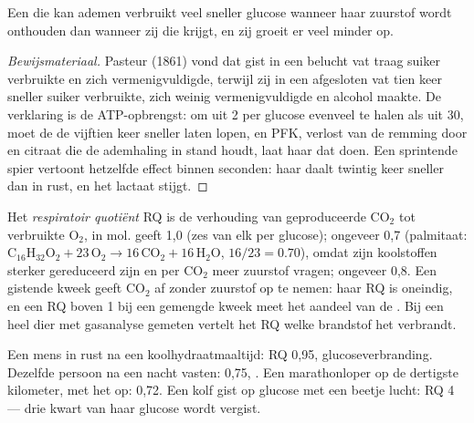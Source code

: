 \begin{proposition}\label{prop:b1:respiration-fermentation:pasteur}
Een  die kan ademen verbruikt veel sneller glucose wanneer haar zuurstof wordt
onthouden dan wanneer zij die krijgt, en zij groeit er veel minder op.
\end{proposition}
\begin{proof}[Bewijsmateriaal]
Pasteur (1861) vond dat gist in een belucht vat traag suiker verbruikte en zich
vermenigvuldigde, terwijl zij in een afgesloten vat tien keer sneller suiker
verbruikte, zich weinig vermenigvuldigde en alcohol maakte. De verklaring is de
ATP-opbrengst: om uit 2 per glucose evenveel  te halen als uit 30, moet de 
de  vijftien keer sneller laten lopen, en PFK, verlost van de remming
door  en citraat die de ademhaling in stand houdt, laat haar dat doen. Een
sprintende spier vertoont hetzelfde effect binnen seconden: haar  daalt
twintig keer sneller dan in rust, en het lactaat stijgt.
\end{proof}

\begin{definition}\label{def:b1:respiration-fermentation:rq}
Het \emph{respiratoir quotiënt} RQ is de verhouding van geproduceerde
$\mathrm{CO_2}$ tot verbruikte $\mathrm{O_2}$, in mol.  geeft 1,0 (zes
van elk per glucose);  ongeveer 0,7 (palmitaat:
$\mathrm{C_{16}H_{32}O_2} + 23\,\mathrm{O_2} \to 16\,\mathrm{CO_2} +
16\,\mathrm{H_2O}$, $16/23 = 0.70$), omdat zijn koolstoffen sterker gereduceerd
zijn en per $\mathrm{CO_2}$ meer zuurstof vragen;  ongeveer 0,8. Een gistende
kweek geeft $\mathrm{CO_2}$ af zonder zuurstof op te nemen: haar RQ is oneindig, en
een RQ boven 1 bij een gemengde kweek meet het aandeel van de . Bij een heel
dier met gasanalyse gemeten vertelt het RQ welke brandstof het verbrandt.
\end{definition}

\begin{example}\label{ex:b1:respiration-fermentation:readrq}
Een mens in rust na een koolhydraatmaaltijd: RQ 0,95, glucoseverbranding.
Dezelfde persoon na een nacht vasten: 0,75, . Een marathonloper op de dertigste
kilometer, met het  op: 0,72. Een kolf gist op glucose met een beetje
lucht: RQ 4 --- drie kwart van haar glucose wordt vergist.
\end{example}

